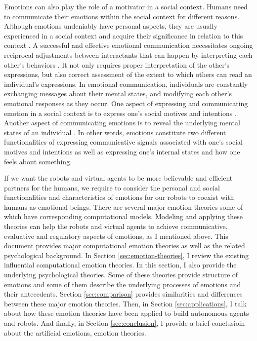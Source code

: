 \documentclass[11pt]{article}
\begin{document}
Emotions can also play the role of a motivator in a social context. Humans need
to communicate their emotions within the social context for different reasons.
Although emotions undeniably have personal aspects, they are usually experienced
in a social context and acquire their significance in relation to this context
\cite{parkinson:emotion-social-interaction}. A successful and effective
emotional communication necessitates ongoing reciprocal adjustments between
interactants that can happen by interpreting each other's behaviors
\cite{parkinson:emotion-social-interaction}. It not only requires proper
interpretation of the other's expressions, but also correct assessment of the
extent to which others can read an individual's expressions. In emotional
communication, individuals are constantly exchanging messages about their mental
states, and modifying each other's emotional responses as they occur. One aspect
of expressing and communicating emotion in a social context is to express one's
social motives and intentions \cite{hess:darwin-emotion}. Another aspect of
communicating emotions is to reveal the underlying mental states of an
individual \cite{parkinson:emotion-communication}. In other words, emotions
constitute two different functionalities of expressing communicative signals
associated with one's social motives and intentions as well as expressing one's
internal states and how one feels about something. 

If we want the robots and virtual agents to be more believable and efficient
partners for the humans, we require to consider the personal and social
functionalities and characteristics of emotions for our robots to coexist with
humans as emotional beings. There are several major emotion theories some of
which have corresponding computational models. Modeling and applying these
theories can help the robots and virtual agents to achieve communicative,
evaluative and regulatory aspects of emotions, as I mentioned above. This
document provides major computational emotion theories as well as the related
psychological background. In Section \ref{sec:emotion-theories}, I review the
existing influential computational emotion theories. In this section, I also
provide the underlying psychological theories. Some of these theories provide
structure of emotions and some of them describe the underlying processes of
emotions and their antecedents. Section \ref{sec:comparison} provides
similarities and differences between these major emotion theories. Then, in
Section \ref{sec:applications}, I talk about how these emotion theories have
been applied to build autonomous agents and robots. And finally, in Section
\ref{sec:conclusion}, I provide a brief conclusioin about the artificial
emotions, emotion theories.
\end{document}
